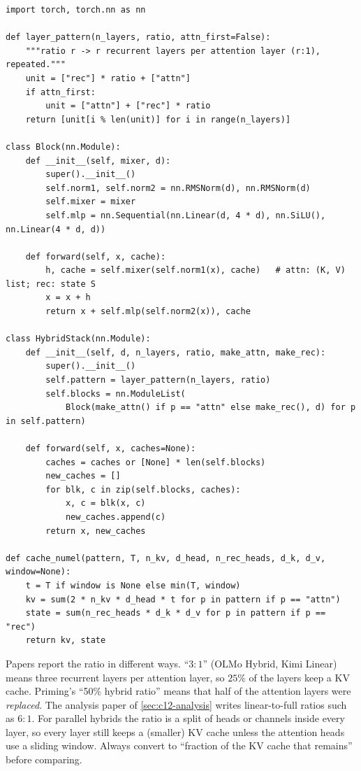\begin{lstlisting}[caption={Reference implementation (ours): a serial hybrid stack with a configurable ratio.},label={lst:c12-stack}]
import torch, torch.nn as nn

def layer_pattern(n_layers, ratio, attn_first=False):
    """ratio r -> r recurrent layers per attention layer (r:1), repeated."""
    unit = ["rec"] * ratio + ["attn"]
    if attn_first:
        unit = ["attn"] + ["rec"] * ratio
    return [unit[i % len(unit)] for i in range(n_layers)]

class Block(nn.Module):
    def __init__(self, mixer, d):
        super().__init__()
        self.norm1, self.norm2 = nn.RMSNorm(d), nn.RMSNorm(d)
        self.mixer = mixer
        self.mlp = nn.Sequential(nn.Linear(d, 4 * d), nn.SiLU(), nn.Linear(4 * d, d))

    def forward(self, x, cache):
        h, cache = self.mixer(self.norm1(x), cache)   # attn: (K, V) list; rec: state S
        x = x + h
        return x + self.mlp(self.norm2(x)), cache

class HybridStack(nn.Module):
    def __init__(self, d, n_layers, ratio, make_attn, make_rec):
        super().__init__()
        self.pattern = layer_pattern(n_layers, ratio)
        self.blocks = nn.ModuleList(
            Block(make_attn() if p == "attn" else make_rec(), d) for p in self.pattern)

    def forward(self, x, caches=None):
        caches = caches or [None] * len(self.blocks)
        new_caches = []
        for blk, c in zip(self.blocks, caches):
            x, c = blk(x, c)
            new_caches.append(c)
        return x, new_caches

def cache_numel(pattern, T, n_kv, d_head, n_rec_heads, d_k, d_v, window=None):
    t = T if window is None else min(T, window)
    kv = sum(2 * n_kv * d_head * t for p in pattern if p == "attn")
    state = sum(n_rec_heads * d_k * d_v for p in pattern if p == "rec")
    return kv, state
\end{lstlisting}

\begin{pitfall}[title={Pitfall: ``hybrid ratio'' is not a standard unit}]
Papers report the ratio in different ways. ``$3{:}1$'' (OLMo Hybrid, Kimi Linear) means three
recurrent layers per attention layer, so $25\%$ of the layers keep a KV cache. Priming's ``50\%
hybrid ratio'' means that half of the attention layers were \emph{replaced}. The analysis paper
of \cref{sec:c12-analysis} writes linear-to-full ratios such as $6{:}1$. For parallel hybrids the
ratio is a split of heads or channels inside every layer, so every layer still keeps a (smaller)
KV cache unless the attention heads use a sliding window. Always convert to ``fraction of the
KV cache that remains'' before comparing.
\end{pitfall}
